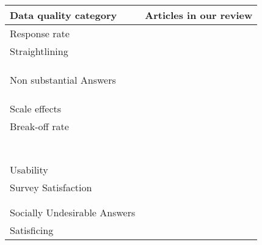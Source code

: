 \begin{table}
	\centering
	\begin{tabular}{ll}
		\toprule
		Data quality category & Articles in our review\\
		\midrule
        Response rate & \cite{lambert_living_2015, tourangeau_web_2018}\\
        Straightlining & \cite{erens_comparing_2019, mavletova_grid_2018}\\
    	& \cite{lugtig_recruiting_2019, struminskaya_effects_2015}\\
    	& \cite{lugtig_use_2016, tourangeau_web_2018}\\
    	& \cite{keusch_web_2017}\\
        Non substantial Answers & \cite{revilla_comparing_2018, mavletova_data_2013}\\
    	& \cite{antoun_effects_2017, schlosser_mobile_2018}\\
    	& \cite{revilla_open_2016, toepoel_sliders_2018}\\
    	& \cite{skeie_smartphone_2019}\\
        Scale effects & \cite{krebs_exploring_2021, tourangeau_web_2018}\\
        Break-off rate & \cite{erens_comparing_2019, mavletova_data_2013}\\
    	& \cite{hartman_does_2019, liebe_does_2015}\\
    	& \cite{lee_experimental_2019, mavletova_grid_2018}\\
    	& \cite{lambert_living_2015, bosch_measurement_2019}\\
    	& \cite{schlosser_mobile_2018, brosnan_pc_2017}\\
    	& \cite{mavletova_sensitive_2013, keusch_web_2017}\\
    	& \cite{toepoel_what_2014, steinbrecher_why_2015}\\
    	& \cite{couper_why_2017}\\
        Usability & \cite{mavletova_grid_2018, huff_comparison_2015}\\
        Survey Satisfaction & \cite{de_bruijne_comparing_2013 mavletova_grid_2018}\\
    	& \cite{mavletova_sensitive_2013, lugtig_use_2016}\\
    	& \cite{toepoel_what_2014}\\
        Socially Undesirable Answers & \cite{mavletova_data_2013, antoun_effects_2017}\\
        Satisficing & \cite{revilla_experiment_2017, erens_comparing_2019}\\

\end{tabular}
\end{table}
